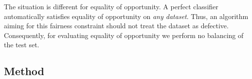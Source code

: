 The situation is different for equality of opportunity.
A perfect classifier automatically satisfies equality of opportunity on \emph{any dataset}.
Thus, an algorithm aiming for this fairness constraint should not treat the dataset as defective.
Consequently, for evaluating equality of opportunity we perform no balancing of the test set.

\subsection{Method}
\begin{table}[tb]
\caption{%
  Accuracy and fairness (with respect to \emph{demographic parity}) for various methods
  on the balanced test set of the Adult dataset.
  Fairness is defined as $\textit{PR}_{s=0}/\textit{PR}_{s=1}$ (a completely fair model would achieve a value of 1.0).
  Left: using \textsc{race} as the sensitive attribute. Right: using \textsc{gender} as the sensitive attribute.
  The mean and std of $10$ repeated experiments.
}%
\label{tab:dempar}%
\centering
{}
\end{table}
